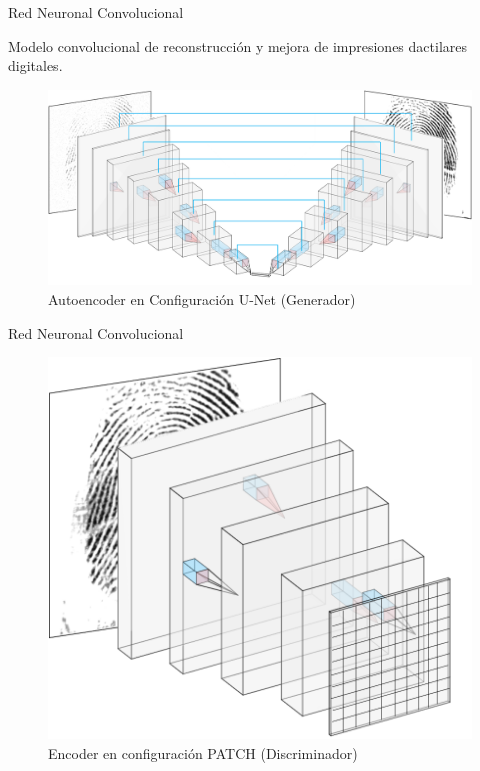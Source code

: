 \documentclass[12pt,aspectratio=169]{beamer}
\begin{document}
\begin{frame}{Red Neuronal Convolucional}

    Modelo convolucional de reconstrucción y mejora de impresiones dactilares digitales.

    \begin{figure}[h]
        \includegraphics[scale=0.42]{figs/layers_nn_u.PNG}
        \caption{Autoencoder en Configuración U-Net (Generador)}
    \end{figure}

\end{frame}


\begin{frame}{Red Neuronal Convolucional}

    \begin{figure}[h]
        \includegraphics[scale=0.4]{figs/disc_cuad.png}
        \caption{Encoder en configuración PATCH (Discriminador)}
    \end{figure}

\end{frame}
\end{document}
